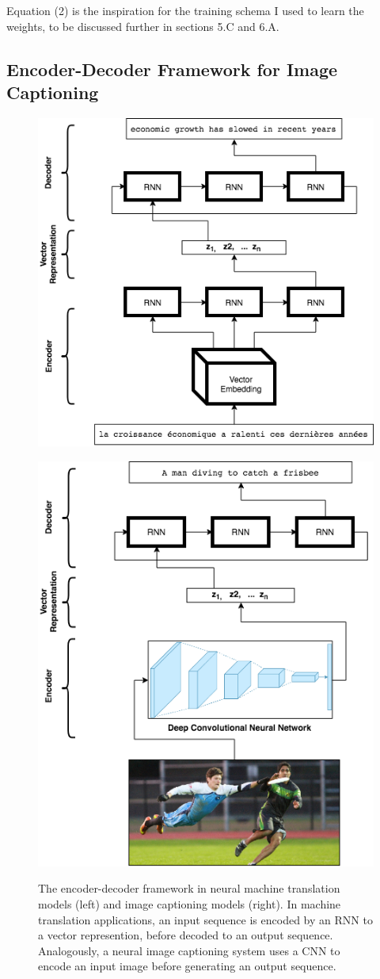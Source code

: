 \documentclass[letterpaper, 10 pt, conference]{ieeeconf}
\begin{document}
Equation (2) is the inspiration for the training schema I used to learn the weights, to be discussed further in sections 5.C and 6.A.

\subsection{Encoder-Decoder Framework for Image Captioning}


\begin{figure}[h]
\centering
\begin{minipage}{.5\textwidth}
  \centering
  \includegraphics[width=.65\linewidth]{encoder_decoder_trans}
  \label{fig:test1}
\end{minipage}%
\begin{minipage}{.5\textwidth}
  \centering
  \includegraphics[width=.65\linewidth]{encoder_decoder_cnn}
  \label{fig:test2}
\end{minipage}
\caption{The encoder-decoder framework in neural machine translation models (left) and image captioning models (right). In machine translation applications, an input sequence is encoded by an RNN to a vector represention, before decoded to an output sequence. Analogously, a neural image captioning system uses a CNN to encode an input image before generating an output sequence.}
\end{figure}
\end{document}

